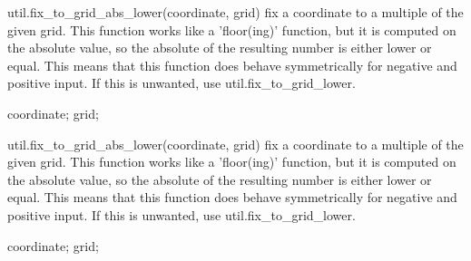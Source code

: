 \begin{APIfunc}{util.fix\_to\_grid\_abs\_lower(coordinate, grid)}
    fix a coordinate to a multiple of the given grid. This function works like a 'floor(ing)' function, but it is computed on the absolute value, so the absolute of the resulting number is either lower or equal. This means that this function does behave symmetrically for negative and positive input. If this is unwanted, use util.fix\_to\_grid\_lower.
    \begin{APIparameters}
            coordinate;
            grid;
    \end{APIparameters}
\end{APIfunc}
\begin{APIfunc}{util.fix\_to\_grid\_abs\_lower(coordinate, grid)}
    fix a coordinate to a multiple of the given grid. This function works like a 'floor(ing)' function, but it is computed on the absolute value, so the absolute of the resulting number is either lower or equal. This means that this function does behave symmetrically for negative and positive input. If this is unwanted, use util.fix\_to\_grid\_lower.
    \begin{APIparameters}
            coordinate;
            grid;
    \end{APIparameters}
\end{APIfunc}


